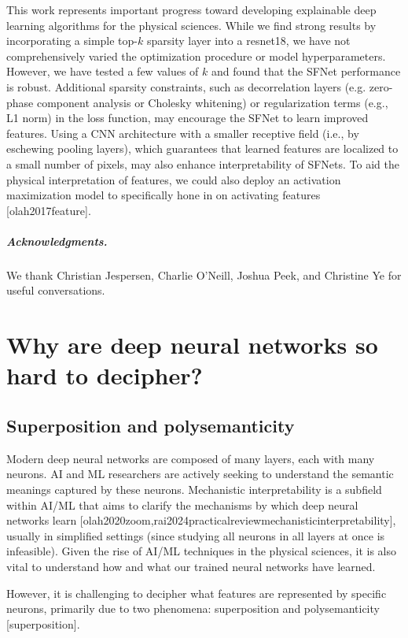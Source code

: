 \documentclass[11pt,a4paper]{article}
\begin{document}
This work represents important progress toward developing explainable deep learning algorithms for the physical sciences. While we find strong results by incorporating a simple top-$k$ sparsity layer into a resnet18, we have not comprehensively varied the optimization procedure or model hyperparameters. However, we have tested a few values of $k$ and found that the SFNet performance is robust. Additional sparsity constraints, such as decorrelation layers (e.g. zero-phase component analysis or Cholesky whitening) or regularization terms (e.g., L1 norm) in the loss function, may encourage the SFNet to learn improved features. Using a CNN architecture with a smaller receptive field (i.e., by eschewing pooling layers), which guarantees that learned features are localized to a small number of pixels, may also enhance interpretability of SFNets. To aid the physical interpretation of features, we could also deploy an activation maximization model to specifically hone in on activating features [olah2017feature].

\subparagraph{Acknowledgments.}

We thank Christian Jespersen, Charlie O'Neill, Joshua Peek, and Christine Ye for useful conversations.

\section{Why are deep neural networks so hard to decipher?}

\subsection{Superposition and polysemanticity}

Modern deep neural networks are composed of many layers, each with many neurons. 
AI and ML researchers are actively seeking to understand the semantic meanings captured by these neurons.
Mechanistic interpretability is a subfield within AI/ML that aims to clarify the mechanisms by which deep neural networks learn [olah2020zoom,rai2024practicalreviewmechanisticinterpretability], usually in simplified settings (since studying all neurons in all layers at once is infeasible).
Given the rise of AI/ML techniques in the physical sciences, it is also vital to understand how and what our trained neural networks have learned.

However, it is challenging to decipher what features are represented by specific neurons, primarily due to two phenomena: superposition and polysemanticity [superposition].
\end{document}
